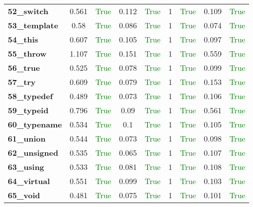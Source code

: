 \documentclass{article}
\begin{document}
\begin{xltabular}{\textwidth}{lcccccccc}
\textbf{52\_switch}& 0.561&\textcolor{green}{True}& 0.112&\textcolor{green}{True}& 1&\textcolor{green}{True}& 0.109&\textcolor{green}{True} \\[0.5ex]
\textbf{53\_template}& 0.58&\textcolor{green}{True}& 0.086&\textcolor{green}{True}& 1&\textcolor{green}{True}& 0.074&\textcolor{green}{True} \\[0.5ex]
\textbf{54\_this}& 0.607&\textcolor{green}{True}& 0.105&\textcolor{green}{True}& 1&\textcolor{green}{True}& 0.097&\textcolor{green}{True} \\[0.5ex]
\textbf{55\_throw}& 1.107&\textcolor{green}{True}& 0.151&\textcolor{green}{True}& 1&\textcolor{green}{True}& 0.559&\textcolor{green}{True} \\[0.5ex]
\textbf{56\_true}& 0.525&\textcolor{green}{True}& 0.078&\textcolor{green}{True}& 1&\textcolor{green}{True}& 0.099&\textcolor{green}{True} \\[0.5ex]
\textbf{57\_try}& 0.609&\textcolor{green}{True}& 0.079&\textcolor{green}{True}& 1&\textcolor{green}{True}& 0.153&\textcolor{green}{True} \\[0.5ex]
\textbf{58\_typedef}& 0.489&\textcolor{green}{True}& 0.073&\textcolor{green}{True}& 1&\textcolor{green}{True}& 0.106&\textcolor{green}{True} \\[0.5ex]
\textbf{59\_typeid}& 0.796&\textcolor{green}{True}& 0.09&\textcolor{green}{True}& 1&\textcolor{green}{True}& 0.561&\textcolor{green}{True} \\[0.5ex]
\textbf{60\_typename}& 0.534&\textcolor{green}{True}& 0.1&\textcolor{green}{True}& 1&\textcolor{green}{True}& 0.105&\textcolor{green}{True} \\[0.5ex]
\textbf{61\_union}& 0.544&\textcolor{green}{True}& 0.073&\textcolor{green}{True}& 1&\textcolor{green}{True}& 0.098&\textcolor{green}{True} \\[0.5ex]
\textbf{62\_unsigned}& 0.535&\textcolor{green}{True}& 0.065&\textcolor{green}{True}& 1&\textcolor{green}{True}& 0.107&\textcolor{green}{True} \\[0.5ex]
\textbf{63\_using}& 0.533&\textcolor{green}{True}& 0.081&\textcolor{green}{True}& 1&\textcolor{green}{True}& 0.108&\textcolor{green}{True} \\[0.5ex]
\textbf{64\_virtual}& 0.551&\textcolor{green}{True}& 0.099&\textcolor{green}{True}& 1&\textcolor{green}{True}& 0.103&\textcolor{green}{True} \\[0.5ex]
\textbf{65\_void}& 0.481&\textcolor{green}{True}& 0.075&\textcolor{green}{True}& 1&\textcolor{green}{True}& 0.101&\textcolor{green}{True} \\[0.5ex]

\end{xltabular}
\end{document}
